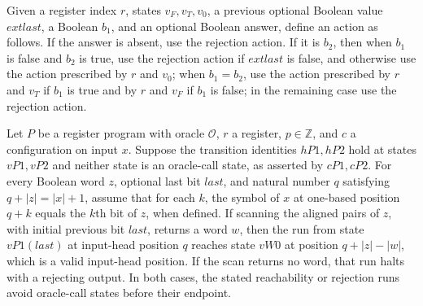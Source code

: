 \begin{definition}
\label{Complexity.LogProg.valP2Act}
\leanok
{}
Given a register index $r$, states $v_F,v_T,v_0$, a previous optional Boolean value
$	ext{last}$, a Boolean $b_1$, and an optional Boolean answer, define an action as
follows. If the answer is absent, use the rejection action. If it is $b_2$, then when
$b_1$ is false and $b_2$ is true, use the rejection action if $	ext{last}$ is false, and
otherwise use the action prescribed by $r$ and $v_0$; when $b_1=b_2$, use the action
prescribed by $r$ and $v_T$ if $b_1$ is true and by $r$ and $v_F$ if $b_1$ is false; in
the remaining case use the rejection action.
\end{definition}

\begin{lemma}
\label{Complexity.LogProg.valPairs_run}
\leanok
{}
Let $P$ be a register program with oracle $\mathcal O$, $r$ a register, $p\in\mathbb Z$,
and $c$ a configuration on input $x$. Suppose the transition identities $hP1,hP2$ hold
at states $vP1,vP2$ and neither state is an oracle-call state, as asserted by $cP1,cP2$.
For every Boolean word $z$, optional last bit $last$, and natural number $q$ satisfying
$q+|z|=|x|+1$, assume that for each $k$, the symbol of $x$ at one-based position $q+k$
equals the $k$th bit of $z$, when defined. If scanning the aligned pairs of $z$, with
initial previous bit $last$, returns a word $w$, then the run from state $vP1(last)$ at
input-head position $q$ reaches state $vW0$ at position $q+|z|-|w|$, which is a valid
input-head position. If the scan returns no word, that run halts with a rejecting
output. In both cases, the stated reachability or rejection runs avoid oracle-call
states before their endpoint.
\end{lemma}

